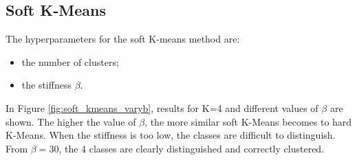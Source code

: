 \documentclass[a4paper,10pt]{article}
\begin{document}
\subsection{Soft K-Means}

The hyperparameters for the soft K-means method are:
\begin{itemize}
\item the number of clusters;
\item the stiffness $\beta$.
\end{itemize}

In Figure \ref{fig:soft_kmeans_varyb}, results for K=4 and different values of $\beta$ are shown. The higher the value of $\beta$, the more similar soft K-Means becomes to hard K-Means. When the stiffness is too low, the classes are difficult to distinguish. From $\beta = 30$, the 4 classes are clearly distinguished and correctly clustered.  
\end{document}
